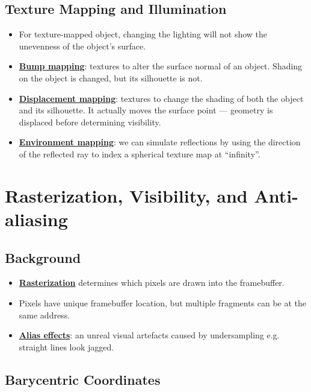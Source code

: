 \documentclass[twocolumn,landscape,10pt]{article}
\theoremstyle{definition}
\begin{document}
\subsection{Texture Mapping and Illumination}

\begin{itemize}
    \item For texture-mapped object, changing the lighting will not show the
        unevenness of the object's surface.
    \item \underline{\textbf{Bump mapping}}: textures to alter the surface
        normal of an object. Shading on the object is changed, but its
        silhouette is not.
    \item \underline{\textbf{Displacement mapping}}: textures to change the
        shading of both the object and its silhouette. It actually moves the
        surface point --- geometry is displaced before determining visibility.
    \item \underline{\textbf{Environment mapping}}: we can simulate reflections
        by using the direction of the reflected ray to index a spherical texture
        map at ``infinity''.
\end{itemize} 

\section{Rasterization, Visibility, and Anti-aliasing}

\subsection{Background}

\begin{itemize}
    \item \underline{\textbf{Rasterization}} determines which pixels are drawn
        into the framebuffer.
    \item Pixels have unique framebuffer location, but multiple fragments can be
        at the same address.
    \item \underline{\textbf{Alias effects}}: an unreal visual artefacts 
        caused by undersampling e.g. straight lines look jagged.
\end{itemize} 

\subsection{Barycentric Coordinates}
\end{document}
